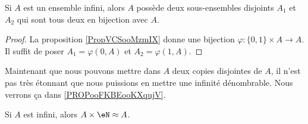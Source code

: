 \begin{corollary}       \label{CORooJCSIooOeOICJ}
	Si \( A\) est un ensemble infini, alors \( A\) possède deux sous-ensembles disjoints \( A_1\) et \( A_2\) qui sont tous deux en bijection avec \( A\).
\end{corollary}

\begin{proof}
	La proposition \ref{PropVCSooMzmIX} donne une bijection \( \varphi\colon \{ 0,1 \}\times A\to A\). Il suffit de poser \( A_1=\varphi(0,A)\) et \( A_2=\varphi(1,A)\).
\end{proof}

\begin{normaltext}	\label{NORMooInfiniteCopies}
	Maintenant que nous pouvons mettre dans \( A\) deux copies disjointes de \( A\), il n'est pas très étonnant que nous puissions en mettre une infinité dénombrable. Nous verrons ça dans \ref{PROPooFKBEooKXqujV}.
\end{normaltext}

\begin{proposition} \label{PROPooFKBEooKXqujV}
	Si \( A\) est infini, alors \( A\times \eN\approx A\).
\end{proposition}


